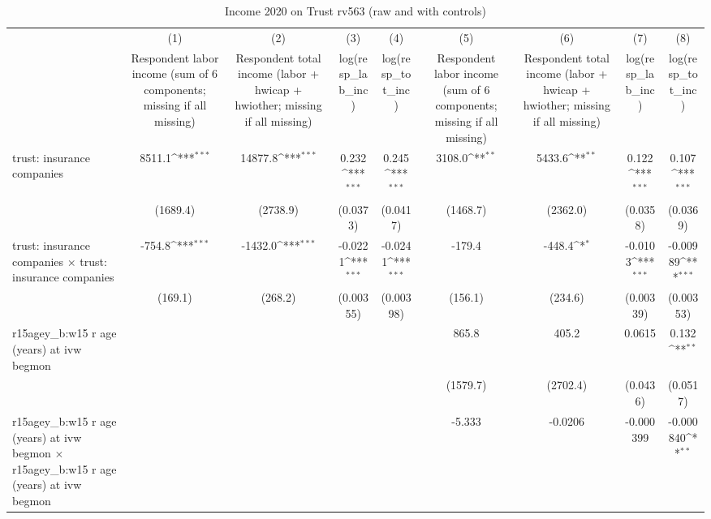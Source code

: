 \begin{table}[htbp]\centering
\def\sym#1{\ifmmode^{#1}\else\(^{#1}\)\fi}
\caption{Income 2020 on Trust rv563 (raw and with controls)}
\begin{tabular}{l*{8}{c}}
\toprule
                &\multicolumn{1}{c}{(1)}&\multicolumn{1}{c}{(2)}&\multicolumn{1}{c}{(3)}&\multicolumn{1}{c}{(4)}&\multicolumn{1}{c}{(5)}&\multicolumn{1}{c}{(6)}&\multicolumn{1}{c}{(7)}&\multicolumn{1}{c}{(8)}\\
                &\multicolumn{1}{c}{Respondent labor income (sum of 6 components; missing if all missing)}&\multicolumn{1}{c}{Respondent total income (labor + hwicap + hwiother; missing if all missing)}&\multicolumn{1}{c}{log(resp\_lab\_inc)}&\multicolumn{1}{c}{log(resp\_tot\_inc)}&\multicolumn{1}{c}{Respondent labor income (sum of 6 components; missing if all missing)}&\multicolumn{1}{c}{Respondent total income (labor + hwicap + hwiother; missing if all missing)}&\multicolumn{1}{c}{log(resp\_lab\_inc)}&\multicolumn{1}{c}{log(resp\_tot\_inc)}\\
\midrule
trust: insurance companies&   8511.1\sym{***}&  14877.8\sym{***}&    0.232\sym{***}&    0.245\sym{***}&   3108.0\sym{**} &   5433.6\sym{**} &    0.122\sym{***}&    0.107\sym{***}\\
                & (1689.4)         & (2738.9)         & (0.0373)         & (0.0417)         & (1468.7)         & (2362.0)         & (0.0358)         & (0.0369)         \\
\addlinespace
trust: insurance companies $\times$ trust: insurance companies&   -754.8\sym{***}&  -1432.0\sym{***}&  -0.0221\sym{***}&  -0.0241\sym{***}&   -179.4         &   -448.4\sym{*}  &  -0.0103\sym{***}& -0.00989\sym{***}\\
                &  (169.1)         &  (268.2)         &(0.00355)         &(0.00398)         &  (156.1)         &  (234.6)         &(0.00339)         &(0.00353)         \\
\addlinespace
r15agey\_b:w15 r age (years) at ivw begmon&                  &                  &                  &                  &    865.8         &    405.2         &   0.0615         &    0.132\sym{**} \\
                &                  &                  &                  &                  & (1579.7)         & (2702.4)         & (0.0436)         & (0.0517)         \\
\addlinespace
r15agey\_b:w15 r age (years) at ivw begmon $\times$ r15agey\_b:w15 r age (years) at ivw begmon&                  &                  &                  &                  &   -5.333         &  -0.0206         &-0.000399         &-0.000840\sym{**} \\

\end{tabular}
\end{table}
